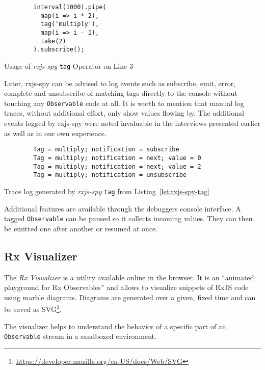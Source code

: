 \documentclass[12pt,a4paper]{article}
\begin{document}
\begin{listing}[H]
	\begin{verbatim}
		interval(1000).pipe(
		  map(i => i * 2),
		  tag('multiply'),
		  map(i => i - 1),
		  take(2)
		).subscribe();
	\end{verbatim}
	\caption{Usage of \emph{rxjs-spy} \texttt{tag} Operator on Line 3}
	\label{lst:rxjs-spy-tag}
\end{listing}

Later, rxjs-spy can be advised to log events such as subscribe, emit, error, complete and unsubscribe of matching tags directly to the console without touching any \texttt{Observable} code at all. It is worth to mention that manual log traces, without additional effort, only show values flowing by. The additional events logged by rxjs-spy were noted invaluable in the interviews presented earlier as well as in our own experience.

\begin{listing}[H]
	\begin{verbatim}
		Tag = multiply; notification = subscribe
		Tag = multiply; notification = next; value = 0
		Tag = multiply; notification = next; value = 2
		Tag = multiply; notification = unsubscribe
	\end{verbatim}
	\caption{Trace log generated by \emph{rxjs-spy} \texttt{tag} from Listing~\ref{lst:rxjs-spy-tag}}
	\label{lst:rxjs-spy-log}
\end{listing}

Additional features are available through the debuggers console interface. A tagged \texttt{Observable} can be paused so it collects incoming values. They can then be emitted one after another or resumed at once.

\subsection{Rx Visualizer}

The \emph{Rx Visualizer}\cite{rxviz} is a utility available online in the browser. It is an ``animated playground for Rx Observables''\cite{rxviz} and allows to visualize snippets of RxJS code using marble diagrams. Diagrams are generated over a given, fixed time and can be saved as SVG\footnote{\url{https://developer.mozilla.org/en-US/docs/Web/SVG}}.

The visualizer helps to understand the behavior of a specific part of an \texttt{Observable} stream in a sandboxed environment.
\end{document}
